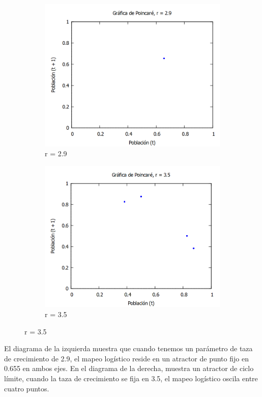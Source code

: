 \documentclass[a4paper]{article}
\begin{document}
\begin{figure}[!ht]
\begin{subfigure}{0.6\textwidth}
  \centering
  \includegraphics[width=0.8\linewidth]{Poincare29.png}
   \caption{r = 2.9}
\end{subfigure}
\begin{subfigure}{0.6\textwidth}
  \centering
  \includegraphics[width=0.8\linewidth]{Poincare35.png}
  \caption{r = 3.5}
\end{subfigure}
\end{figure}

\pagebreak

El diagrama de la izquierda muestra que cuando tenemos un parámetro de taza de crecimiento de 2.9, el mapeo logístico reside en un atractor de punto fijo en 0.655 en ambos ejes. En el diagrama de la derecha, muestra un atractor de ciclo límite, cuando la taza de crecimiento se fija en 3.5, el mapeo logístico oscila entre cuatro puntos. 
\end{document}
